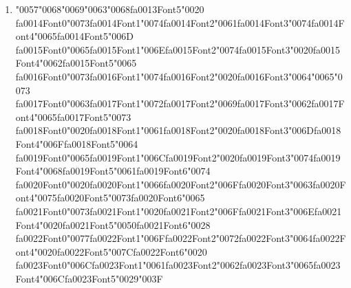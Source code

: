 \documentclass[11pt]{article}
\begin{document}
\begin{enumerate}[label=Q\arabic*., leftmargin=*]
\textbf{A.} Beginning of an entity

\textbf{B.} Inside an entity

\textbf{C.} Outside any entity

\textbf{D.} Between two tokens

\item {\char"0057}{\char"0068}{\char"0069}{\char"0063}{\char"0068}{\csname fa0013Font5\endcsname\char"0020} {\csname fa0014Font0\endcsname\char"0073}{\csname fa0014Font1\endcsname\char"0074}{\csname fa0014Font2\endcsname\char"0061}{\csname fa0014Font3\endcsname\char"0074}{\csname fa0014Font4\endcsname\char"0065}{\csname fa0014Font5\endcsname\char"006D} {\csname fa0015Font0\endcsname\char"0065}{\csname fa0015Font1\endcsname\char"006E}{\csname fa0015Font2\endcsname\char"0074}{\csname fa0015Font3\endcsname\char"0020}{\csname fa0015Font4\endcsname\char"0062}{\csname fa0015Font5\endcsname\char"0065} {\csname fa0016Font0\endcsname\char"0073}{\csname fa0016Font1\endcsname\char"0074}{\csname fa0016Font2\endcsname\char"0020}{\csname fa0016Font3\endcsname\char"0064}{\char"0065}{\char"0073} {\csname fa0017Font0\endcsname\char"0063}{\csname fa0017Font1\endcsname\char"0072}{\csname fa0017Font2\endcsname\char"0069}{\csname fa0017Font3\endcsname\char"0062}{\csname fa0017Font4\endcsname\char"0065}{\csname fa0017Font5\endcsname\char"0073} {\csname fa0018Font0\endcsname\char"0020}{\csname fa0018Font1\endcsname\char"0061}{\csname fa0018Font2\endcsname\char"0020}{\csname fa0018Font3\endcsname\char"006D}{\csname fa0018Font4\endcsname\char"006F}{\csname fa0018Font5\endcsname\char"0064} {\csname fa0019Font0\endcsname\char"0065}{\csname fa0019Font1\endcsname\char"006C}{\csname fa0019Font2\endcsname\char"0020}{\csname fa0019Font3\endcsname\char"0074}{\csname fa0019Font4\endcsname\char"0068}{\csname fa0019Font5\endcsname\char"0061}{\csname fa0019Font6\endcsname\char"0074} {\csname fa0020Font0\endcsname\char"0020}{\csname fa0020Font1\endcsname\char"0066}{\csname fa0020Font2\endcsname\char"006F}{\csname fa0020Font3\endcsname\char"0063}{\csname fa0020Font4\endcsname\char"0075}{\csname fa0020Font5\endcsname\char"0073}{\csname fa0020Font6\endcsname\char"0065} {\csname fa0021Font0\endcsname\char"0073}{\csname fa0021Font1\endcsname\char"0020}{\csname fa0021Font2\endcsname\char"006F}{\csname fa0021Font3\endcsname\char"006E}{\csname fa0021Font4\endcsname\char"0020}{\csname fa0021Font5\endcsname\char"0050}{\csname fa0021Font6\endcsname\char"0028} {\csname fa0022Font0\endcsname\char"0077}{\csname fa0022Font1\endcsname\char"006F}{\csname fa0022Font2\endcsname\char"0072}{\csname fa0022Font3\endcsname\char"0064}{\csname fa0022Font4\endcsname\char"0020}{\csname fa0022Font5\endcsname\char"007C}{\csname fa0022Font6\endcsname\char"0020} {\csname fa0023Font0\endcsname\char"006C}{\csname fa0023Font1\endcsname\char"0061}{\csname fa0023Font2\endcsname\char"0062}{\csname fa0023Font3\endcsname\char"0065}{\csname fa0023Font4\endcsname\char"006C}{\csname fa0023Font5\endcsname\char"0029}{\char"003F}


\end{enumerate}
\end{document}
